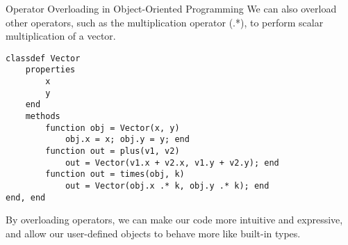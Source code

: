 \documentclass[handout]{beamer}
\begin{document}
\begin{frame}[fragile]{Operator Overloading in Object-Oriented Programming}
We can also overload other operators, such as the multiplication operator (.*), to perform scalar multiplication of a vector.

\begin{lstlisting}[style=matlab]
classdef Vector
    properties
        x
        y
    end
    methods
        function obj = Vector(x, y)
            obj.x = x; obj.y = y; end
        function out = plus(v1, v2)
            out = Vector(v1.x + v2.x, v1.y + v2.y); end
        function out = times(obj, k)
            out = Vector(obj.x .* k, obj.y .* k); end
end, end
\end{lstlisting}

By overloading operators, we can make our code more intuitive and expressive, and allow our user-defined objects to behave more like built-in types.
\end{frame}

\end{document}

